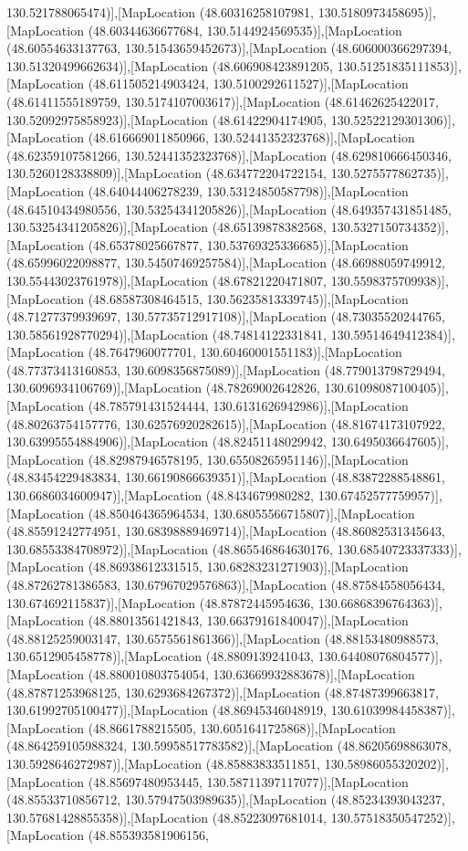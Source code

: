 130.521788065474)],[MapLocation (48.60316258107981, 130.5180973458695)],[MapLocation (48.60344636677684, 130.5144924569535)],[MapLocation (48.60554633137763, 130.51543659452673)],[MapLocation (48.606000366297394, 130.51320499662634)],[MapLocation (48.606908423891205, 130.51251835111853)],[MapLocation (48.611505214903424, 130.5100292611527)],[MapLocation (48.61411555189759, 130.5174107003617)],[MapLocation (48.61462625422017, 130.52092975858923)],[MapLocation (48.61422904174905, 130.52522129301306)],[MapLocation (48.616669011850966, 130.52441352323768)],[MapLocation (48.62359107581266, 130.52441352323768)],[MapLocation (48.629810666450346, 130.5260128338809)],[MapLocation (48.634772204722154, 130.5275577862735)],[MapLocation (48.64044406278239, 130.53124850587798)],[MapLocation (48.64510434980556, 130.53254341205826)],[MapLocation (48.649357431851485, 130.53254341205826)],[MapLocation (48.65139878382568, 130.5327150734352)],[MapLocation (48.65378025667877, 130.53769325336685)],[MapLocation (48.65996022098877, 130.54507469257584)],[MapLocation (48.66988059749912, 130.55443023761978)],[MapLocation (48.67821220471807, 130.5598375709938)],[MapLocation (48.68587308464515, 130.56235813339745)],[MapLocation (48.71277379939697, 130.57735712917108)],[MapLocation (48.73035520244765, 130.58561928770294)],[MapLocation (48.74814122331841, 130.59514649412384)],[MapLocation (48.7647960077701, 130.60460001551183)],[MapLocation (48.77373413160853, 130.6098356875089)],[MapLocation (48.779013798729494, 130.6096934106769)],[MapLocation (48.78269002642826, 130.61098087100405)],[MapLocation (48.785791431524444, 130.6131626942986)],[MapLocation (48.80263754157776, 130.62576920282615)],[MapLocation (48.81674173107922, 130.63995554884906)],[MapLocation (48.82451148029942, 130.6495036647605)],[MapLocation (48.82987946578195, 130.65508265951146)],[MapLocation (48.83454229483834, 130.66190866639351)],[MapLocation (48.83872288548861, 130.6686034600947)],[MapLocation (48.8434679980282, 130.67452577759957)],[MapLocation (48.850464365964534, 130.68055566715807)],[MapLocation (48.85591242774951, 130.68398889469714)],[MapLocation (48.86082531345643, 130.68553384708972)],[MapLocation (48.865546864630176, 130.68540723337333)],[MapLocation (48.86938612331515, 130.68283231271903)],[MapLocation (48.87262781386583, 130.67967029576863)],[MapLocation (48.87584558056434, 130.674692115837)],[MapLocation (48.87872445954636, 130.66868396764363)],[MapLocation (48.88013561421843, 130.66379161840047)],[MapLocation (48.88125259003147, 130.6575561861366)],[MapLocation (48.88153480988573, 130.6512905458778)],[MapLocation (48.8809139241043, 130.64408076804577)],[MapLocation (48.880010803754054, 130.63669932883678)],[MapLocation (48.87871253968125, 130.6293684267372)],[MapLocation (48.87487399663817, 130.61992705100477)],[MapLocation (48.86945346048919, 130.61039984458387)],[MapLocation (48.8661788215505, 130.6051641725868)],[MapLocation (48.864259105988324, 130.59958517783582)],[MapLocation (48.86205698863078, 130.5928646272987)],[MapLocation (48.85883833511851, 130.58986055320202)],[MapLocation (48.85697480953445, 130.58711397117077)],[MapLocation (48.85533710856712, 130.57947503989635)],[MapLocation (48.85234393043237, 130.57681428855358)],[MapLocation (48.85223097681014, 130.57518350547252)],[MapLocation (48.855393581906156, 